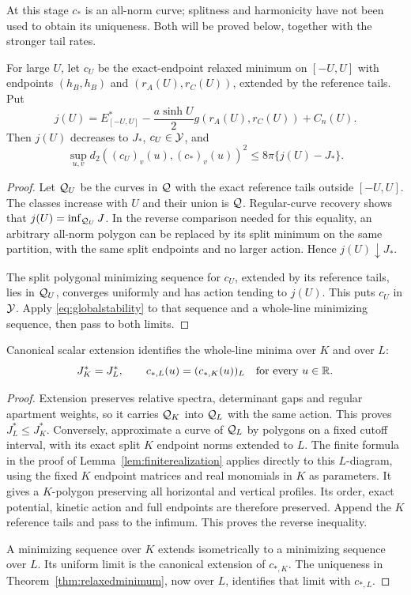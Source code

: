At this stage $c_*$ is an all-norm curve; splitness and harmonicity
have not been used to obtain its uniqueness. Both will be proved
below, together with the stronger tail rates.

\begin{proposition}\label{prop:finitecutoff}
For large $U$, let $c_U$ be the exact-endpoint relaxed minimum on
$[-U,U]$ with endpoints $(h_B,h_B)$ and $(r_A(U),r_C(U))$, extended
by the reference tails. Put
\[
 j(U)=E_{[-U,U]}^*-\frac{a\sinh U}{2}g(r_A(U),r_C(U))+C_n(U).
\]
Then $j(U)$ decreases to $J_*$, $c_U\in\mathcal Y$, and
\begin{equation}\label{eq:finitecutoffconvergence}
 \sup_{u,v}d_2((c_U)_v(u),(c_*)_v(u))^2
       \le8\pi\{j(U)-J_*\}.
\end{equation}
\end{proposition}

\begin{proof}
Let $\mathcal Q_U$ be the curves in $\mathcal Q$ with the exact reference tails
outside $[-U,U]$. The classes increase with $U$ and their union is
$\mathcal Q$. Regular-curve recovery shows that
$j(U)=\inf_{\mathcal Q_U}J$. In the reverse comparison needed for this
equality, an arbitrary all-norm polygon can be replaced by its
split minimum on the same partition, with the same split endpoints
and no larger action. Hence $j(U)\downarrow J_*$.

The split polygonal minimizing sequence for $c_U$, extended by its
reference tails, lies in $\mathcal Q_U$, converges uniformly and has action
tending to $j(U)$. This puts $c_U$ in $\mathcal Y$. Apply
\eqref{eq:globalstability} to that sequence and a whole-line
minimizing sequence, then pass to both limits.
\end{proof}

\begin{proposition}\label{prop:extensionminimum}
Canonical scalar extension identifies the whole-line minima over $K$
and over $L$:
\[
 J_K^*=J_L^*,\qquad c_{*,L}(u)=(c_{*,K}(u))_L
 \quad\text{for every }u\in\mathbb R.
\]
\end{proposition}

\begin{proof}
Extension preserves relative spectra, determinant gaps and regular
apartment weights, so it carries $\mathcal Q_K$ into $\mathcal Q_L$ with the
same action. This proves $J_L^*\le J_K^*$.
Conversely, approximate a curve of $\mathcal Q_L$ by polygons on a fixed
cutoff interval, with its exact split $K$ endpoint norms extended to
$L$. The finite formula in the proof of
Lemma~\ref{lem:finiterealization} applies directly to this $L$-diagram,
using the fixed $K$ endpoint matrices and real monomials in $K$ as
parameters. It gives a $K$-polygon preserving all horizontal and
vertical profiles. Its order, exact potential, kinetic action and
full endpoints are therefore preserved. Append the $K$ reference
tails and pass to the infimum. This proves the reverse inequality.

A minimizing sequence over $K$ extends isometrically to a minimizing
sequence over $L$. Its uniform limit is the canonical extension of
$c_{*,K}$. The uniqueness in Theorem~\ref{thm:relaxedminimum}, now
over $L$, identifies that limit with $c_{*,L}$.
\end{proof}
